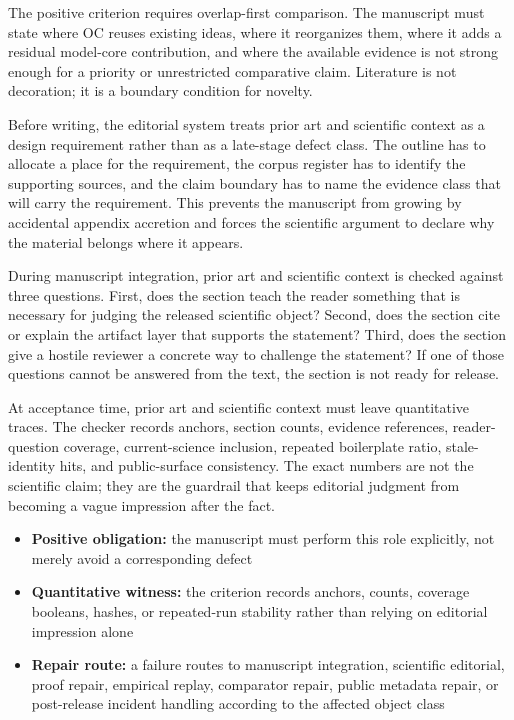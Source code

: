The positive criterion requires overlap-first comparison. The manuscript must state where OC reuses existing ideas, where it reorganizes them, where it adds a residual model-core contribution, and where the available evidence is not strong enough for a priority or unrestricted comparative claim. Literature is not decoration; it is a boundary condition for novelty.


Before writing, the editorial system treats prior art and scientific context as a design requirement rather than as a late-stage defect class. The outline has to allocate a place for the requirement, the corpus register has to identify the supporting sources, and the claim boundary has to name the evidence class that will carry the requirement. This prevents the manuscript from growing by accidental appendix accretion and forces the scientific argument to declare why the material belongs where it appears.


During manuscript integration, prior art and scientific context is checked against three questions. First, does the section teach the reader something that is necessary for judging the released scientific object? Second, does the section cite or explain the artifact layer that supports the statement? Third, does the section give a hostile reviewer a concrete way to challenge the statement? If one of those questions cannot be answered from the text, the section is not ready for release.


At acceptance time, prior art and scientific context must leave quantitative traces. The checker records anchors, section counts, evidence references, reader-question coverage, current-science inclusion, repeated boilerplate ratio, stale-identity hits, and public-surface consistency. The exact numbers are not the scientific claim; they are the guardrail that keeps editorial judgment from becoming a vague impression after the fact.


\begin{itemize}[leftmargin=1.8em]

\item \textbf{Positive obligation:} the manuscript must perform this role explicitly, not merely avoid a corresponding defect

\item \textbf{Quantitative witness:} the criterion records anchors, counts, coverage booleans, hashes, or repeated-run stability rather than relying on editorial impression alone

\item \textbf{Repair route:} a failure routes to manuscript integration, scientific editorial, proof repair, empirical replay, comparator repair, public metadata repair, or post-release incident handling according to the affected object class

\end{itemize}

